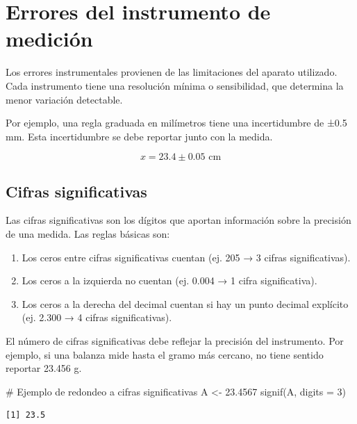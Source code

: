 \documentclass[
  spanish,
  letterpaper,
  DIV=11,
  numbers=noendperiod]{scrreprt}
\newenvironment{Shaded}{\begin{snugshade}}{\end{snugshade}}
\newcommand{\AttributeTok}[1]{\textcolor[rgb]{0.40,0.45,0.13}{#1}}
\newcommand{\CommentTok}[1]{\textcolor[rgb]{0.37,0.37,0.37}{#1}}
\newcommand{\DecValTok}[1]{\textcolor[rgb]{0.68,0.00,0.00}{#1}}
\newcommand{\FloatTok}[1]{\textcolor[rgb]{0.68,0.00,0.00}{#1}}
\newcommand{\FunctionTok}[1]{\textcolor[rgb]{0.28,0.35,0.67}{#1}}
\newcommand{\NormalTok}[1]{\textcolor[rgb]{0.00,0.23,0.31}{#1}}
\newcommand{\OtherTok}[1]{\textcolor[rgb]{0.00,0.23,0.31}{#1}}
\providecommand{\tightlist}{%
  \setlength{\itemsep}{0pt}\setlength{\parskip}{0pt}}
\begin{document}
\section{Errores del instrumento de
medición}\label{errores-del-instrumento-de-mediciuxf3n}

Los errores instrumentales provienen de las limitaciones del aparato
utilizado. Cada instrumento tiene una resolución mínima o sensibilidad,
que determina la menor variación detectable.

Por ejemplo, una regla graduada en milímetros tiene una incertidumbre de
±0.5 mm. Esta incertidumbre se debe reportar junto con la medida.

\[ x = 23.4 \pm 0.05 \text{ cm} \]

\subsection{Cifras significativas}\label{cifras-significativas}

Las cifras significativas son los dígitos que aportan información sobre
la precisión de una medida. Las reglas básicas son:

\begin{enumerate}
\def\labelenumi{\arabic{enumi}.}
\tightlist
\item
  Los ceros entre cifras significativas cuentan (ej. 205 → 3 cifras
  significativas).
\item
  Los ceros a la izquierda no cuentan (ej. 0.004 → 1 cifra
  significativa).
\item
  Los ceros a la derecha del decimal cuentan si hay un punto decimal
  explícito (ej. 2.300 → 4 cifras significativas).
\end{enumerate}

El número de cifras significativas debe reflejar la precisión del
instrumento. Por ejemplo, si una balanza mide hasta el gramo más
cercano, no tiene sentido reportar 23.456 g.

\begin{Shaded}
\begin{Highlighting}[]
\CommentTok{\# Ejemplo de redondeo a cifras significativas}
\NormalTok{A }\OtherTok{\textless{}{-}} \FloatTok{23.4567}
\FunctionTok{signif}\NormalTok{(A, }\AttributeTok{digits =} \DecValTok{3}\NormalTok{)}
\end{Highlighting}
\end{Shaded}

\begin{verbatim}
[1] 23.5
\end{verbatim}
\end{document}
